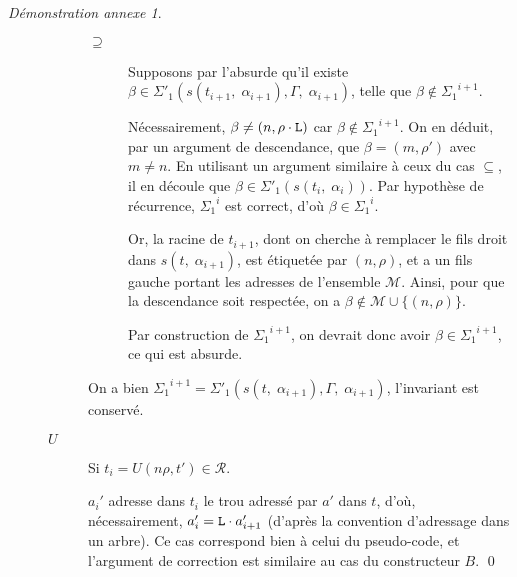 \documentclass[11pt,a4paper]{article}
\theoremstyle{plain}
\theoremstyle{definition}
\theoremstyle{remark}
\newtheorem{demonstrationappendix}{Démonstration annexe}
\newcommand*{\someadd}{\rho}
\newcommand*{\sequent}{\Gamma}
\newcommand*{\Left}{\textnormal{\texttt{L}}}
\newcommand*{\representations}{\ensuremath{\mathcal{R}}}
\newcommand*{\highapprox}{\ensuremath{\Sigma_1}}
\newcommand*{\highapproxspec}{\ensuremath{\Sigma'_1}}
\newcommand*{\treesimplify}{\ensuremath{s}}
\begin{document}
\begin{demonstrationappendix}
\begin{description}
\begin{description}
\begin{description}
                \item[$\supseteq$]
                    Supposons par l'absurde qu'il existe $\beta \in \highapproxspec \left( \treesimplify( t_{i+1}, \; {\alpha}_{i+1} ), \sequent, \; {\alpha}_{i+1} \right)$, telle que $\beta \notin {\highapprox}^{i+1}$. 
                    
                    Nécessairement, $\beta \neq (n, \someadd \cdot \Left)$ car $\beta \notin {\highapprox}^{i+1}$. On en déduit, par un argument de descendance, que $\beta = (m, \someadd')$ avec $m \neq n$. En utilisant un argument similaire à ceux du cas $\subseteq$, il en découle que $\beta \in \highapproxspec \left( \treesimplify( t_{i}, \; {\alpha}_{i} ) \right)$. Par hypothèse de récurrence, ${\highapprox}^{i}$ est correct, d'où $\beta \in {\highapprox}^{i}$.
                    
                    Or, la racine de $t_{i+1}$, dont on cherche à remplacer le fils droit dans $\treesimplify( t, \; {\alpha}_{i+1} )$, est étiquetée par $(n, \rho)$, et a un fils gauche portant les adresses de l'ensemble $\mathcal{M}$. Ainsi, pour que la descendance soit respectée, on a $\beta \notin \mathcal{M} \cup \{ (n, \someadd) \}$.

                    Par construction de ${\highapprox}^{i+1}$, on devrait donc avoir $\beta \in {\highapprox}^{i+1}$, ce qui est absurde.
            \end{description}

            On a bien ${\highapprox}^{i+1} = \highapproxspec \left( \treesimplify( t, \; {\alpha}_{i+1} ), \sequent, \; {\alpha}_{i+1} \right)$, l'invariant est conservé.
    
            \item[$U$] Si $t_i = U(n\rho, t') \in \representations$.
    
            $a_i'$ adresse dans $t_i$ le trou adressé par $a'$ dans $t$, d'où, nécessairement, $a_i' = \Left \cdot a_{i+1}'$ (d'après la convention d'adressage dans un arbre). Ce cas correspond bien à celui du pseudo-code, et l'argument de correction est similaire au cas du constructeur $B$.
\qed
        \end{description}
    \end{description}
\end{demonstrationappendix}
\end{document}
